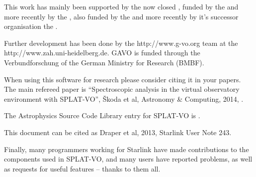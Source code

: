\documentclass[twoside,11pt,nolof]{starlink}
\providecommand{\SPLAT}{\textsf{SPLAT-VO}}
\begin{document}
This work has mainly been supported by the now closed
,
funded by the
and more recently by the
,
also funded by the
and more recently by it's successor organisation the
.

Further development has been done by the 
 {http://www.g-vo.org} team at the 
 {http://www.zah.uni-heidelberg.de}. 
GAVO is funded through the Verbundforschung of the German Ministry for Research (BMBF).

When using this software for research please consider citing it in your papers. The main
refereed paper is ``Spectroscopic analysis in the virtual observatory environment with SPLAT-VO'',
\v{S}koda et al, Astronomy \& Computing, 2014,
.

The Astrophysics Source Code Library entry for SPLAT-VO is .

This document can be cited as Draper et al, 2013, Starlink User Note 243.

Finally, many programmers working for Starlink have made contributions to the
components used in \SPLAT, and many users have reported problems, as well as
requests for useful features -- thanks to them all.
\end{document}
